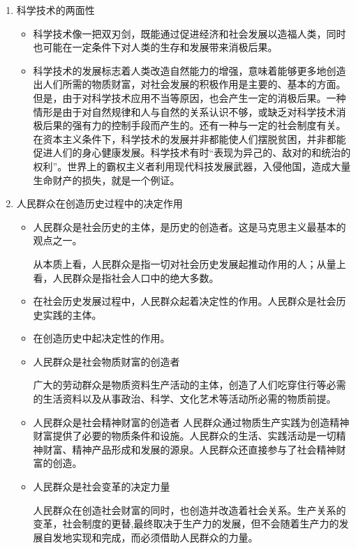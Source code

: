 \documentclass[device=pad,lang=cn,UTF8]{elegantbook}
\begin{document}
    \begin{enumerate}
        \item 科学技术的两面性
        \begin{itemize}
            \item 科学技术像一把双刃剑，既能通过促进经济和社会发展以造福人类，同时也可能在一定条件下对人类的生存和发展带来消极后果。
            \item 科学技术的发展标志着人类改造自然能力的增强，意味着能够更多地创造出人们所需的物质财富，对社会发展的积极作用是主要的、基本的方面。但是，由于对科学技术应用不当等原因，也会产生一定的消极后果。一种情形是由于对自然规律和人与自然的关系认识不够，或缺乏对科学技术消极后果的强有力的控制手段而产生的。还有一种与一定的社会制度有关。在资本主义条件下，科学技术的发展并非都能使人们摆脱贫困，并非都能促进人们的身心健康发展。科学技术有时“表现为异己的、敌对的和统治的权利”。世界上的霸权主义者利用现代科技发展武器，入侵他国，造成大量生命财产的损失，就是一个例证。
        \end{itemize}
        \item 人民群众在创造历史过程中的决定作用
        \begin{itemize}
            \item 人民群众是社会历史的主体，是历史的创造者。这是马克思主义最基本的观点之一。\par
            从本质上看，人民群众是指一切对社会历史发展起推动作用的人；从量上看，人民群众是指社会人口中的绝大多数。
            \item 在社会历史发展过程中，人民群众起着决定性的作用。人民群众是社会历史实践的主体。
            \item 在创造历史中起决定性的作用。
            \item 人民群众是社会物质财富的创造者\par
            广大的劳动群众是物质资料生产活动的主体，创造了人们吃穿住行等必需的生活资料以及从事政治、科学、文化艺术等活动所必需的物质前提。
            \item 人民群众是社会精神财富的创造者
            人民群众通过物质生产实践为创造精神财富提供了必要的物质条件和设施。人民群众的生活、实践活动是一切精神财富、精神产品形成和发展的源泉。人民群众还直接参与了社会精神财富的创造。
            \item 人民群众是社会变革的决定力量\par
            人民群众在创造社会财富的同时，也创造并改造着社会关系。生产关系的变革，社会制度的更替,最终取决于生产力的发展，但不会随着生产力的发展自发地实现和完成，而必须借助人民群众的力量。\par

\end{itemize}
\end{enumerate}
\end{document}
